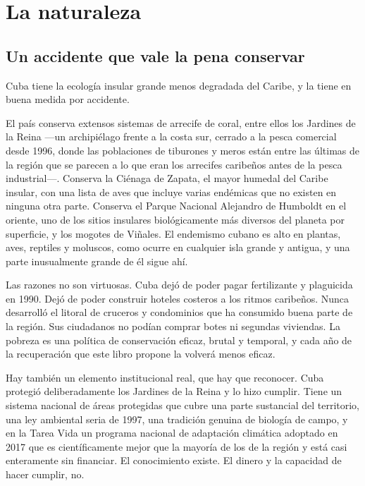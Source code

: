 \chapter{La naturaleza}
\label{ch:nature}

\section{Un accidente que vale la pena conservar}

Cuba tiene la ecología insular grande menos degradada del Caribe, y la tiene en buena medida por
accidente.

El país conserva extensos sistemas de arrecife de coral, entre ellos los Jardines de la Reina
---un archipiélago frente a la costa sur, cerrado a la pesca comercial desde 1996, donde las
poblaciones de tiburones y meros están entre las últimas de la región que se parecen a lo que
eran los arrecifes caribeños antes de la pesca industrial---. Conserva la Ciénaga de Zapata, el
mayor humedal del Caribe insular, con una lista de aves que incluye varias endémicas que no
existen en ninguna otra parte. Conserva el Parque Nacional Alejandro de Humboldt en el oriente,
uno de los sitios insulares biológicamente más diversos del planeta por superficie, y los
mogotes de Viñales. El endemismo cubano es alto en plantas, aves, reptiles y moluscos, como
ocurre en cualquier isla grande y antigua, y una parte inusualmente grande de él sigue ahí.

Las razones no son virtuosas. Cuba dejó de poder pagar fertilizante y plaguicida en 1990. Dejó de
poder construir hoteles costeros a los ritmos caribeños. Nunca desarrolló el litoral de cruceros
y condominios que ha consumido buena parte de la región. Sus ciudadanos no podían comprar botes
ni segundas viviendas. La pobreza es una política de conservación eficaz, brutal y temporal, y
cada año de la recuperación que este libro propone la volverá menos eficaz.

Hay también un elemento institucional real, que hay que reconocer. Cuba protegió deliberadamente
los Jardines de la Reina y lo hizo cumplir. Tiene un sistema nacional de áreas protegidas que
cubre una parte sustancial del territorio, una ley ambiental seria de 1997, una tradición genuina
de biología de campo, y en la Tarea Vida un programa nacional de adaptación climática adoptado en
2017 que es científicamente mejor que la mayoría de los de la región y está casi enteramente sin
financiar. El conocimiento existe. El dinero y la capacidad de hacer cumplir, no.

